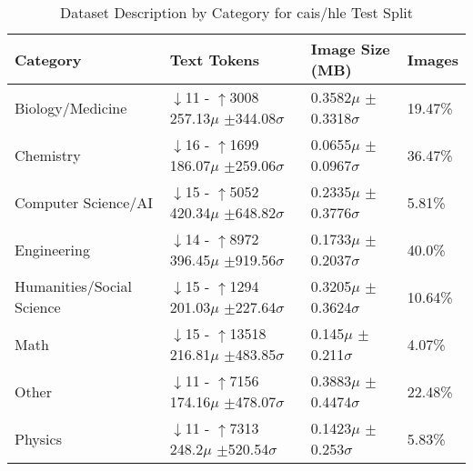 \vspace*{-\baselineskip}
\vspace*{-\baselineskip}
\begin{table}[H]
\centering
\begin{tabular}{llll}
\toprule
Category & Text Tokens  & Image Size (MB) & Images \\
\midrule
Biology/Medicine & $\downarrow$11 - $\uparrow$3008 257.13$\mu$ $\pm$344.08$\sigma$ & 0.3582$\mu$ $\pm$0.3318$\sigma$ & 19.47\% \\
Chemistry & $\downarrow$16 - $\uparrow$1699 186.07$\mu$ $\pm$259.06$\sigma$ & 0.0655$\mu$ $\pm$0.0967$\sigma$ & 36.47\% \\
Computer Science/AI & $\downarrow$15 - $\uparrow$5052 420.34$\mu$ $\pm$648.82$\sigma$ & 0.2335$\mu$ $\pm$0.3776$\sigma$ & 5.81\% \\
Engineering & $\downarrow$14 - $\uparrow$8972 396.45$\mu$ $\pm$919.56$\sigma$ & 0.1733$\mu$ $\pm$0.2037$\sigma$ & 40.0\% \\
Humanities/Social Science & $\downarrow$15 - $\uparrow$1294 201.03$\mu$ $\pm$227.64$\sigma$ & 0.3205$\mu$ $\pm$0.3624$\sigma$ & 10.64\% \\
Math & $\downarrow$15 - $\uparrow$13518 216.81$\mu$ $\pm$483.85$\sigma$ & 0.145$\mu$ $\pm$0.211$\sigma$ & 4.07\% \\
Other & $\downarrow$11 - $\uparrow$7156 174.16$\mu$ $\pm$478.07$\sigma$ & 0.3883$\mu$ $\pm$0.4474$\sigma$ & 22.48\% \\
Physics & $\downarrow$11 - $\uparrow$7313 248.2$\mu$ $\pm$520.54$\sigma$ & 0.1423$\mu$ $\pm$0.253$\sigma$ & 5.83\% \\
\bottomrule
\end{tabular}
\vspace{0.2cm}
\caption{Dataset Description by Category for cais/hle Test Split}
\label{tab:dataset_description}
\end{table}
\vspace*{-\baselineskip}